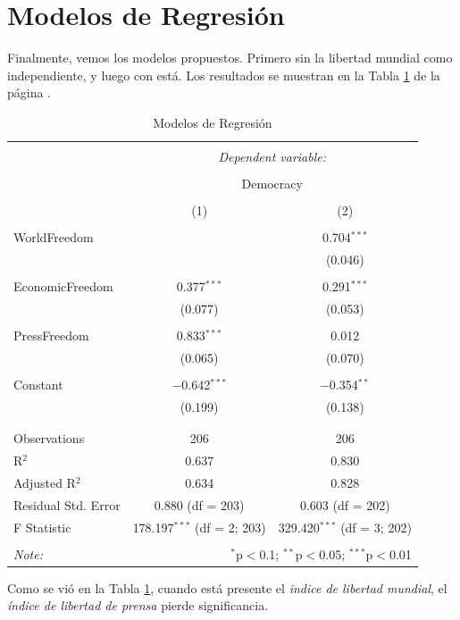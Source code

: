 \documentclass{article}
\begin{document}
\clearpage

\section{Modelos de Regresión}

Finalmente, vemos los modelos propuestos. Primero sin la libertad mundial como independiente, y luego con está. Los resultados se muestran en la Tabla \ref{regresiones} de la página \pageref{regresiones}.



\begin{table}[!htbp] \centering 
  \caption{Modelos de Regresión} 
  \label{regresiones} 
\begin{tabular}{@{\extracolsep{5pt}}lcc} 
\\[-1.8ex]\hline 
\hline \\[-1.8ex] 
 & \multicolumn{2}{c}{\textit{Dependent variable:}} \\ 
\cline{2-3} 
\\[-1.8ex] & \multicolumn{2}{c}{Democracy} \\ 
\\[-1.8ex] & (1) & (2)\\ 
\hline \\[-1.8ex] 
 WorldFreedom &  & 0.704$^{***}$ \\ 
  &  & (0.046) \\ 
  & & \\ 
 EconomicFreedom & 0.377$^{***}$ & 0.291$^{***}$ \\ 
  & (0.077) & (0.053) \\ 
  & & \\ 
 PressFreedom & 0.833$^{***}$ & 0.012 \\ 
  & (0.065) & (0.070) \\ 
  & & \\ 
 Constant & $-$0.642$^{***}$ & $-$0.354$^{**}$ \\ 
  & (0.199) & (0.138) \\ 
  & & \\ 
\hline \\[-1.8ex] 
Observations & 206 & 206 \\ 
R$^{2}$ & 0.637 & 0.830 \\ 
Adjusted R$^{2}$ & 0.634 & 0.828 \\ 
Residual Std. Error & 0.880 (df = 203) & 0.603 (df = 202) \\ 
F Statistic & 178.197$^{***}$ (df = 2; 203) & 329.420$^{***}$ (df = 3; 202) \\ 
\hline 
\hline \\[-1.8ex] 
\textit{Note:}  & \multicolumn{2}{r}{$^{*}$p$<$0.1; $^{**}$p$<$0.05; $^{***}$p$<$0.01} \\ 
\end{tabular} 
\end{table} 
Como se vió en la Tabla \ref{regresiones}, cuando está presente el \emph{indice de libertad mundial}, el \emph{índice de libertad de prensa} pierde significancia.
\end{document}

